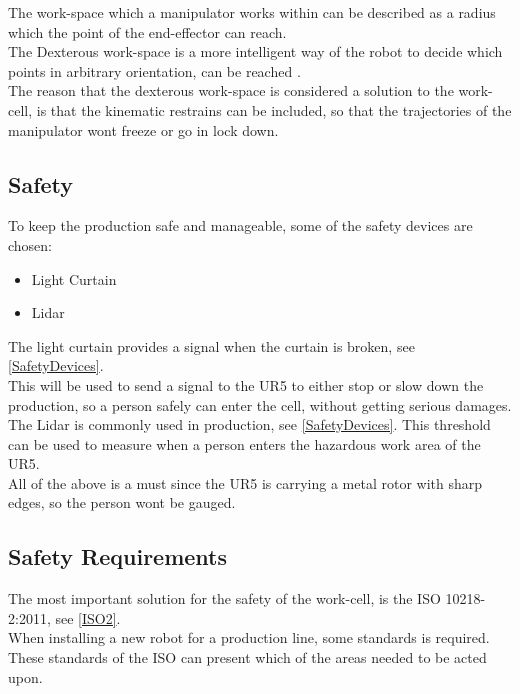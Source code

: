 The work-space which a manipulator works within can be described as a radius which the point of the end-effector can reach.\\
The Dexterous work-space is a more intelligent way of the robot to decide which points in arbitrary orientation, can be reached \cite{Dexterous}.\\
The reason that the dexterous work-space is considered a solution to the work-cell, is that the kinematic restrains can be included, so that the trajectories of the manipulator wont freeze or go in lock down.\\


\subsection{Safety}

To keep the production safe and manageable, some of the safety devices are chosen:

\begin{itemize}
    \item Light Curtain
    \item Lidar
\end{itemize}

The light curtain provides a signal when the curtain is broken, see \ref{SafetyDevices}.\\
This will be used to send a signal to the UR5 to either stop or slow down the production, so a person safely can enter the cell, without getting serious damages.\\

The Lidar is commonly used in production, see \ref{SafetyDevices}.
This threshold can be used to measure when a person enters the hazardous work area of the UR5.\\
All of the above is a must since the UR5 is carrying a metal rotor with sharp edges, so the person wont be gauged.\\

\subsection{Safety Requirements}

The most important solution for the safety of the work-cell, is the ISO 10218-2:2011, see \ref{ISO2}.\\
When installing a new robot for a production line, some standards is required. These standards of the ISO can present which of the areas needed to be acted upon.\\

